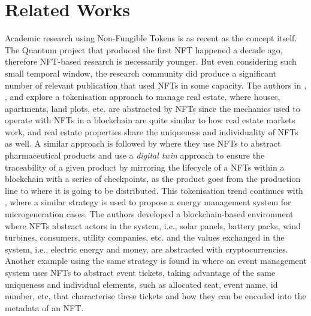 \documentclass[../NFTComp_IEEE.tex]{subfiles}
\begin{document}
\section{Related Works}
\label{sec:related_works}
Academic research using Non-Fungible Tokens is as recent as the concept itself. The Quantum project that produced the first NFT happened a decade ago, therefore NFT-based research is necessarily younger. But even considering such small temporal window, the research community did produce a significant number of relevant publication that used NFTs in some capacity. The authors in \cite{Hung2023}, \cite{Barbuta2024}, and \cite{Sharma2024} explore a tokenisation approach to manage real estate, where houses, apartments, land plots, etc. are abstracted by NFTs since the mechanics used to operate with NFTs in a blockchain are quite similar to how real estate markets work, and real estate properties share the uniqueness and individuality of NFTs as well. A similar approach is followed by \cite{Chiacchio2022} where they use NFTs to abstract pharmaceutical products and use a \textit{digital twin} approach to ensure the traceability of a given product by mirroring the lifecycle of a NFTs within a blockchain with a series of checkpoints, as the product goes from the production line to where it is going to be distributed. This tokenisation trend continues with \cite{Karandikar2021}, where a similar strategy is used to propose a energy management system for microgeneration cases. The authors developed a blockchain-based environment where NFTs abstract actors in the system, i.e., solar panels, battery packs, wind turbines, consumers, utility companies, etc. and the values exchanged in the system, i.e., electric energy and money, are abstracted with cryptocurrencies. Another example using the same strategy is found in \cite{Regner2019} where an event management system uses NFTs to abstract event tickets, taking advantage of the same uniqueness and individual elements, such as allocated seat, event name, id number, etc, that characterise these tickets and how they can be encoded into the metadata of an NFT.
\par
\end{document}
